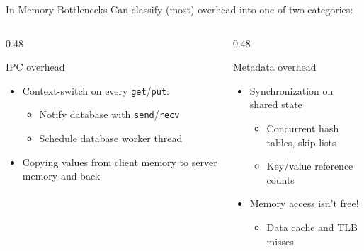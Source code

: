 \documentclass[10pt,aspectratio=169]{beamer}
\begin{document}
\begin{frame}{In-Memory Bottlenecks}
    Can classify (most) overhead into one of two categories:
	\vspace{0.4em}
	\begin{columns}[T, onlytextwidth]
		\begin{column}{0.48\textwidth}
			\begin{block}{IPC overhead}
				\begin{itemize}\setlength\itemsep{2pt}
                    \item Context-switch on every \texttt{get}/\texttt{put}:
                    \begin{itemize}
                        \item Notify database with \texttt{send}/\texttt{recv}
                        \item Schedule database worker thread
                    \end{itemize}
                    \item Copying values from client memory to server memory and
                    back
				\end{itemize}
			\end{block}
		\end{column}
		\begin{column}{0.48\textwidth}
			\begin{block}{Metadata overhead}
				\begin{itemize}\setlength\itemsep{2pt}
                    \item Synchronization on shared state
                    \begin{itemize}
                        \item Concurrent hash tables, skip lists
                        \item Key/value reference counts
                    \end{itemize}
                    \item Memory access isn't free!
                    \begin{itemize}
                        \item Data cache and TLB misses
                    \end{itemize}
				\end{itemize}
			\end{block}
		\end{column}
	\end{columns}
\end{frame}
\end{document}
